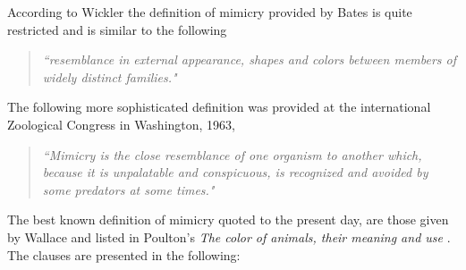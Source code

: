 \documentclass[letterpaper]{article}
\numberwithin{equation}{section}
\begin{document}
According to Wickler the definition of mimicry provided by Bates \cite{bates1862} is quite restricted and is similar to the following

\begin{quote}
\textsl{``resemblance in external appearance, shapes and colors between members of widely distinct families."}
\end{quote}

The following more sophisticated definition was provided at the international Zoological Congress in Washington, 1963,

\begin{quote}
\textsl{``Mimicry is the close resemblance of one organism to another which, because it is unpalatable and conspicuous, is recognized and avoided by some predators at some times."}
\end{quote}

The best known definition of mimicry quoted to the present day, are those given by Wallace and listed in Poulton's \textit{The color of animals, their meaning and use} \cite{poulton1890colours}. The clauses are presented in the following:
\end{document}
